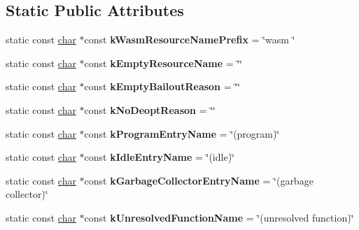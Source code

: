 \subsection*{Static Public Attributes}
\begin{DoxyCompactItemize}
\item 
\mbox{\label{classv8_1_1internal_1_1CodeEntry_a14bdf38d4c3ebcf8f7a63c64d8b4a2e0}} 
static const \mbox{\hyperlink{classchar}{char}} $\ast$const {\bfseries k\+Wasm\+Resource\+Name\+Prefix} = \char`\"{}wasm \char`\"{}
\item 
\mbox{\label{classv8_1_1internal_1_1CodeEntry_a8252e4f992350bf1a093c275694332cb}} 
static const \mbox{\hyperlink{classchar}{char}} $\ast$const {\bfseries k\+Empty\+Resource\+Name} = \char`\"{}\char`\"{}
\item 
\mbox{\label{classv8_1_1internal_1_1CodeEntry_ab3288c79f50d86af34c09214795aa2f2}} 
static const \mbox{\hyperlink{classchar}{char}} $\ast$const {\bfseries k\+Empty\+Bailout\+Reason} = \char`\"{}\char`\"{}
\item 
\mbox{\label{classv8_1_1internal_1_1CodeEntry_a043c3c8bbfd302e3b09b8e51d44e144b}} 
static const \mbox{\hyperlink{classchar}{char}} $\ast$const {\bfseries k\+No\+Deopt\+Reason} = \char`\"{}\char`\"{}
\item 
\mbox{\label{classv8_1_1internal_1_1CodeEntry_af5b4d469a451548eca87b1709e677d46}} 
static const \mbox{\hyperlink{classchar}{char}} $\ast$const {\bfseries k\+Program\+Entry\+Name} = \char`\"{}(program)\char`\"{}
\item 
\mbox{\label{classv8_1_1internal_1_1CodeEntry_a5e09544990d7e511d71d951dc55b31a2}} 
static const \mbox{\hyperlink{classchar}{char}} $\ast$const {\bfseries k\+Idle\+Entry\+Name} = \char`\"{}(idle)\char`\"{}
\item 
\mbox{\label{classv8_1_1internal_1_1CodeEntry_a65525d24c10c0ed71d7830b5a997adce}} 
static const \mbox{\hyperlink{classchar}{char}} $\ast$const {\bfseries k\+Garbage\+Collector\+Entry\+Name} = \char`\"{}(garbage collector)\char`\"{}
\item 
\mbox{\label{classv8_1_1internal_1_1CodeEntry_a1669bc7aedd073be73751251222d08eb}} 
static const \mbox{\hyperlink{classchar}{char}} $\ast$const {\bfseries k\+Unresolved\+Function\+Name} = \char`\"{}(unresolved function)\char`\"{}
\end{DoxyCompactItemize}


